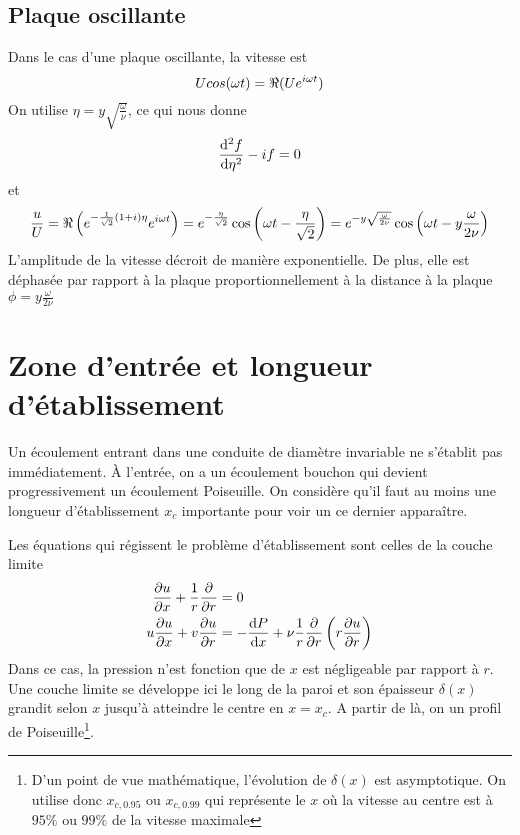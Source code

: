 \documentclass[a4paper,11pt]{report}
\newcommand{\recip}[1]{\frac{1}{#1}}
\begin{document}
    \subsection{Plaque oscillante}
      Dans le cas d'une plaque oscillante, la vitesse est
      \begin{equation}
        U cos(\omega t) = \real(U e^{i\omega t})
      \end{equation}
      On utilise $\eta = y \sqrt{\frac{\omega}{\nu}}$, ce qui nous donne
      \begin{equation}
        \dv[2]{f}{\eta} - i f = 0
      \end{equation}
      et
      \begin{equation}
        \frac{u}{U} = \real\left(e^{-\recip{\sqrt{2}}(1+i)\eta}e^{i\omega t}\right)
        = e^{-\frac{\eta}{\sqrt{2}}}\cos\left(\omega t-\frac{\eta}{\sqrt{2}}\right)
        = e^{-y \sqrt{\frac{\omega}{2\nu}}} \cos\left(\omega t - y\frac{\omega}{2\nu}\right)
      \end{equation}
      L'amplitude de la vitesse décroit de manière exponentielle. De plus, elle est déphasée par rapport à la plaque proportionnellement à la distance à la plaque $\phi = y\frac{\omega}{2\nu}$

  \section{Zone d'entrée et longueur d'établissement}
    Un écoulement entrant dans une conduite de diamètre invariable ne s'établit pas immédiatement. À l'entrée, on a un écoulement bouchon qui devient progressivement un écoulement Poiseuille. On considère qu'il faut au moins une longueur d'établissement $x_c$ importante pour voir un ce dernier apparaître.

    Les équations qui régissent le problème d'établissement sont celles de la couche limite
    \begin{equation}
      \begin{aligned}
        \pdv{u}{x} + \recip{r} \pdv{}{r}(rv) &= 0\\
        u\pdv{u}{x} + v \pdv{u}{r} &= -\dv{P}{x} + \nu \recip{r} \pdv{}{r}\left(r\pdv{u}{r}\right)
      \end{aligned}
    \end{equation}
    Dans ce cas, la pression n'est fonction que de $x$ est négligeable par rapport à $r$. Une couche limite se développe ici le long de la paroi et son épaisseur $\delta(x)$ grandit selon $x$ jusqu'à atteindre le centre en $x = x_c$. A partir de là, on un profil de Poiseuille\footnote{D'un point de vue mathématique, l'évolution de $\delta(x)$ est asymptotique. On utilise donc $x_{c,0.95}$ ou $x_{c,0.99}$ qui représente le $x$ où la vitesse au centre est à $95\%$ ou $99\%$ de la vitesse maximale}.
\end{document}
